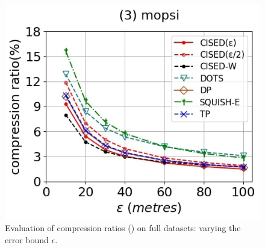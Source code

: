 \begin{figure}[tb!]
	\includegraphics[scale=0.250]{Figures/Exp-SED-CR-epsilon-mopsi.jpg}		
	\vspace{-2ex}
	\caption{\small Evaluation of compression ratios (\sed) on full datasets: varying the error bound $\epsilon$.}
	\label{fig:cr-sed-epsilon}
	\vspace{-2ex}
\end{figure}
